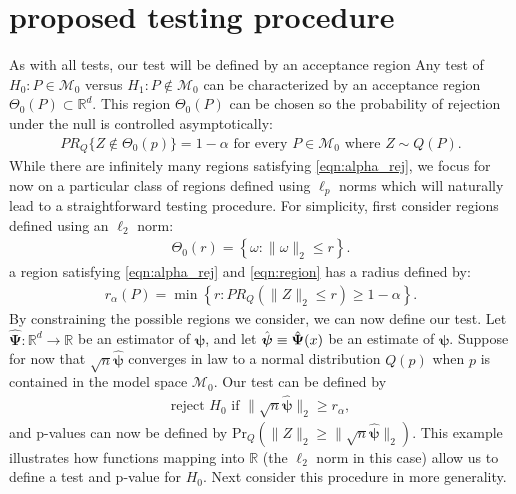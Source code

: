 \documentclass{article}
\newcommand{\disto}{P}
\newcommand{\rvv}{Z}
\newcommand{\distv}{Q}
\begin{document}
\section{proposed testing procedure}
\label{sec:prop_test_proc}
As with all tests, our test will be defined by an acceptance region 
Any test of $H_0 : \disto \in \mathscr{M}_0$ versus $H_1 : \disto \not\in \mathscr{M}_0$ can be characterized by an acceptance region $\Theta_0(\disto) \subset \mathbb{R}^d$. This region $\Theta_0(\disto)$ can be chosen so the probability of rejection under the null is controlled asymptotically:
\begin{align}
  PR_{\distv}\{\rvv \not \in \Theta_0(p)\} = 1 - \alpha \text{ for every } P \in \mathscr{M}_0 \text{ where } \rvv \sim \distv(\disto).\label{eqn:alpha_rej}
\end{align}
While there are infinitely many regions satisfying \eqref{eqn:alpha_rej},  we focus for now on a particular class of regions defined using $\ell_p$ norms which will naturally lead to a straightforward testing procedure. For simplicity, first consider regions defined using an $\ell_2$ norm:
\begin{align}
	\Theta_0(r) = \left\{\omega : \|\omega\|_2 \leq r\right\}. \label{eqn:region}
\end{align}
a region satisfying \eqref{eqn:alpha_rej} and \eqref{eqn:region} has a radius defined by: 
\begin{align*}
	r_\alpha(\disto) = \min\left\{r : PR_{\distv}(\|\rvv\|_2 \leq r) \geq 1 - \alpha \right\}.
\end{align*}
By constraining the possible regions we consider, we can now define our test.  Let $\hat{\boldsymbol{\Psi}} : \mathbb{R}^d \to \mathbb{R}$ be an estimator of $\boldsymbol{\psi}$, and let $\Hat{\boldsymbol{\psi}} \equiv \hat{\boldsymbol{\Psi}}(x)$ be an estimate of $\boldsymbol{\psi}$. Suppose for now that $\sqrt{n}\hat{\boldsymbol{\psi}}$ converges in law to a normal distribution $\distv(p)$ when $p$ is contained in the model space  $\mathcal{M}_0$.  Our test can be defined by 
\begin{align}
\label{eqn:simp_test}
	\text{reject } H_0 \text{ if } \|\sqrt{n} \hat{\boldsymbol{\psi}}\|_2 \geq r_\alpha,
\end{align} and 
 p-values can now be defined by $\text{Pr}_\distv(\|\rvv\|_2 \geq \|\sqrt{n} \hat{\boldsymbol{\psi}}\|_2)$. This example illustrates how functions mapping into $\mathbb{R}$ (the $\ell_2$ norm in this case) allow us to define a test and p-value for $H_0$. Next consider this procedure in more generality.
\end{document}
